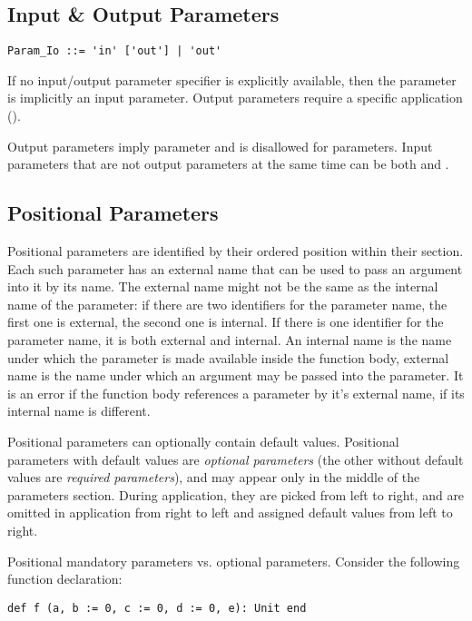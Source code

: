 \subsection{Input \& Output Parameters}
\label{sec:io-parameters}

\syntax\begin{lstlisting}
Param_Io ::= 'in' ['out'] | 'out'
\end{lstlisting}

If no input/output parameter specifier is explicitly available, then the parameter is implicitly an input parameter. Output parameters require a specific application ().

Output parameters imply  parameter and is disallowed for  parameters. Input parameters that are not output parameters at the same time can be both  and . 






\subsection{Positional Parameters}
\label{sec:positional-parameters}

Positional parameters are identified by their ordered position within their section. Each such parameter has an external name that can be used to pass an argument into it by its name. The external name might not be the same as the internal name of the parameter: if there are two identifiers for the parameter name, the first one is external, the second one is internal. If there is one identifier for the parameter name, it is both external and internal. An internal name is the name under which the parameter is made available inside the function body, external name is the name under which an argument may be passed into the parameter. It is an error if the function body references a parameter by it's external name, if its internal name is different. 

Positional parameters can optionally contain default values. Positional parameters with default values are {\em optional parameters} (the other without default values are {\em required parameters}), and may appear only in the middle of the parameters section. During application, they are picked from left to right, and are omitted in application from right to left and assigned default values from left to right.

\example Positional mandatory parameters vs. optional parameters. Consider the following function declaration:
\begin{lstlisting}
def f (a, b := 0, c := 0, d := 0, e): Unit end
\end{lstlisting}

